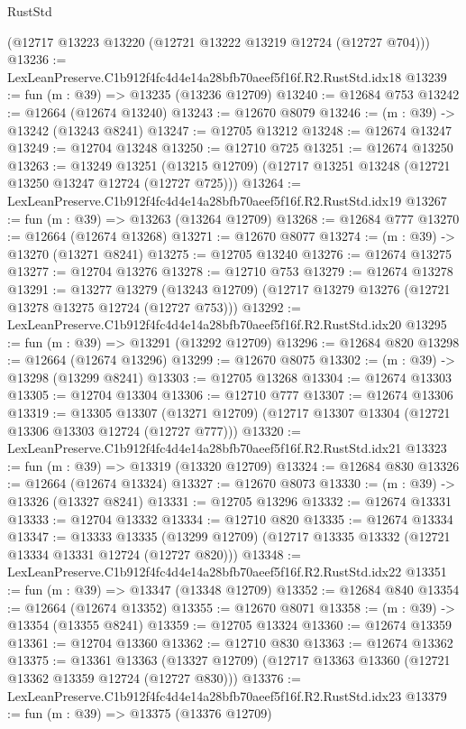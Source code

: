 \begin{lexlean}{RustStd}
\begin{coremodule}
    (@12717 @13223 @13220 (@12721 @13222 @13219 @12724 (@12727 @704)))
@13236 := LexLeanPreserve.C1b912f4fc4d4e14a28bfb70aeef5f16f.R2.RustStd.idx18
@13239 := fun (m : @39) => @13235 (@13236 @12709)
@13240 := @12684 @753
@13242 := @12664 (@12674 @13240)
@13243 := @12670 @8079
@13246 := (m : @39) -> @13242 (@13243 @8241)
@13247 := @12705 @13212
@13248 := @12674 @13247
@13249 := @12704 @13248
@13250 := @12710 @725
@13251 := @12674 @13250
@13263 := @13249
    @13251
    (@13215 @12709)
    (@12717 @13251 @13248 (@12721 @13250 @13247 @12724 (@12727 @725)))
@13264 := LexLeanPreserve.C1b912f4fc4d4e14a28bfb70aeef5f16f.R2.RustStd.idx19
@13267 := fun (m : @39) => @13263 (@13264 @12709)
@13268 := @12684 @777
@13270 := @12664 (@12674 @13268)
@13271 := @12670 @8077
@13274 := (m : @39) -> @13270 (@13271 @8241)
@13275 := @12705 @13240
@13276 := @12674 @13275
@13277 := @12704 @13276
@13278 := @12710 @753
@13279 := @12674 @13278
@13291 := @13277
    @13279
    (@13243 @12709)
    (@12717 @13279 @13276 (@12721 @13278 @13275 @12724 (@12727 @753)))
@13292 := LexLeanPreserve.C1b912f4fc4d4e14a28bfb70aeef5f16f.R2.RustStd.idx20
@13295 := fun (m : @39) => @13291 (@13292 @12709)
@13296 := @12684 @820
@13298 := @12664 (@12674 @13296)
@13299 := @12670 @8075
@13302 := (m : @39) -> @13298 (@13299 @8241)
@13303 := @12705 @13268
@13304 := @12674 @13303
@13305 := @12704 @13304
@13306 := @12710 @777
@13307 := @12674 @13306
@13319 := @13305
    @13307
    (@13271 @12709)
    (@12717 @13307 @13304 (@12721 @13306 @13303 @12724 (@12727 @777)))
@13320 := LexLeanPreserve.C1b912f4fc4d4e14a28bfb70aeef5f16f.R2.RustStd.idx21
@13323 := fun (m : @39) => @13319 (@13320 @12709)
@13324 := @12684 @830
@13326 := @12664 (@12674 @13324)
@13327 := @12670 @8073
@13330 := (m : @39) -> @13326 (@13327 @8241)
@13331 := @12705 @13296
@13332 := @12674 @13331
@13333 := @12704 @13332
@13334 := @12710 @820
@13335 := @12674 @13334
@13347 := @13333
    @13335
    (@13299 @12709)
    (@12717 @13335 @13332 (@12721 @13334 @13331 @12724 (@12727 @820)))
@13348 := LexLeanPreserve.C1b912f4fc4d4e14a28bfb70aeef5f16f.R2.RustStd.idx22
@13351 := fun (m : @39) => @13347 (@13348 @12709)
@13352 := @12684 @840
@13354 := @12664 (@12674 @13352)
@13355 := @12670 @8071
@13358 := (m : @39) -> @13354 (@13355 @8241)
@13359 := @12705 @13324
@13360 := @12674 @13359
@13361 := @12704 @13360
@13362 := @12710 @830
@13363 := @12674 @13362
@13375 := @13361
    @13363
    (@13327 @12709)
    (@12717 @13363 @13360 (@12721 @13362 @13359 @12724 (@12727 @830)))
@13376 := LexLeanPreserve.C1b912f4fc4d4e14a28bfb70aeef5f16f.R2.RustStd.idx23
@13379 := fun (m : @39) => @13375 (@13376 @12709)

\end{coremodule}
\end{lexlean}
